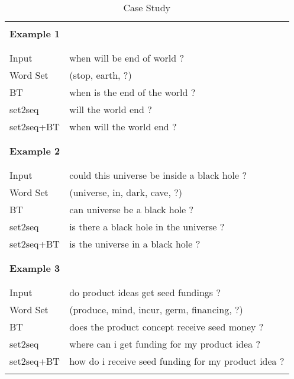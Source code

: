 \begin{table}
\small
\centering
\begin{tabular}{lp{4.6cm}}
\hline 
\\ [-1.8ex]
\textbf{Example 1} & \\
\\ [-1.8ex]
\hline
\\ [-1.8ex]
Input & when will be end of world ? \\
Word Set & (stop, earth, ?) \\
BT & when is the end of the world ? \\
set2seq & will the world end ? \\
set2seq+BT & when will the world end ? \\
\\ [-1.8ex]
\hline
\\ [-1.8ex]
\textbf{Example 2} & \\
\\ [-1.8ex]
\hline
\\ [-1.8ex]
Input & could this universe be inside a black hole ? \\
Word Set & (universe, in, dark, cave, ?) \\
BT & can universe be a black hole ? \\
set2seq & is there a black hole in the universe ? \\
set2seq+BT & is the universe in a black hole ? \\
\\ [-1.8ex]
\hline
\\ [-1.8ex]
\textbf{Example 3} & \\
\\ [-1.8ex]
\hline
\\ [-1.8ex]
Input & do product ideas get seed fundings ? \\
Word Set & (produce, mind, incur, germ, financing, ?) \\
BT & does the product concept receive seed money ? \\
set2seq & where can i get funding for my product idea ? \\
set2seq+BT & how do i receive seed funding for my product idea ? \\
\\ [-1.8ex]
\hline
\end{tabular}
\caption{\label{tab:case} Case Study }
\end{table}
